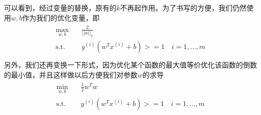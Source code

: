 \documentclass[11pt]{article}
\begin{document}
可以看到，经过变量的替换，原有的$k$不再起作用。为了书写的方便，我们仍然使用$w, b$作为我们的优化变量，即
\begin{align}
\begin{split}
\max_{w, b}\quad&\frac{2}{||w||_2}\\
\text{s.t.}\quad&y^{(i)}(w^Tx^{(i)}+b)>=1\quad i = 1,...,m\\
\end{split}
\end{align}
另外，我们还再变换一下形式，因为优化某个函数的最大值等价优化该函数的倒数的最小值，并且这样做以后方便我们对参数$w$的求导
\begin{align}\label{eq:2}
\begin{split}
\min_{w, b}\quad&\frac{1}{2}w^Tw\\
\text{s.t.}\quad&y^{(i)}(w^Tx^{(i)}+b)>=1\quad i = 1,...,m\\
\end{split}
\end{align}
\end{document}
